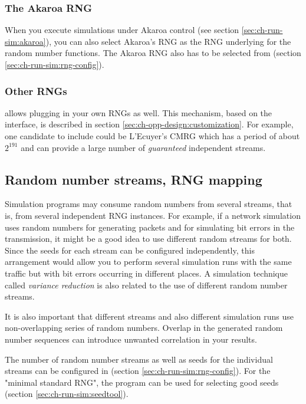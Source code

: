 \subsubsection{The Akaroa RNG}

When you execute simulations under Akaroa control (see section
\ref{sec:ch-run-sim:akaroa}), you can also select Akaroa's
RNG as the RNG underlying for the {\opp} random number functions.
The Akaroa RNG also has to be selected from 
(section \ref{sec:ch-run-sim:rng-config}).

\subsubsection{Other RNGs}

{\opp} allows plugging in your own RNGs as well. This mechanism,
based on the  interface, is described in section
\ref{sec:ch-opp-design:customization}.
For example, one candidate to include could be L'Ecuyer's CMRG \cite{LEcuyer02}
which has a period of about $2^{191}$ and can provide a large
number of \textit{guaranteed} independent streams.


\subsection{Random number streams, RNG mapping}

Simulation programs may consume random numbers from several streams,
that is, from several independent RNG instances. For example, if a
network simulation uses random numbers for generating packets and
for simulating bit errors in the transmission, it might be a good
idea to use different random streams for both. Since the seeds
for each stream can be configured independently, this arrangement
would allow you to perform several simulation runs with the same traffic
but with bit errors occurring in different places.
A simulation technique called \textit{variance reduction} is
also related to the use of different random number streams.

It is also important that different streams and also different
simulation runs use non-overlapping series of random numbers.
Overlap in the generated random number sequences can introduce
unwanted correlation in your results.

The number of random number streams as well as seeds for the individual
streams can be configured in 
(section \ref{sec:ch-run-sim:rng-config}).
For the "minimal standard RNG", the  program can be
used for selecting good seeds (section \ref{sec:ch-run-sim:seedtool}).

